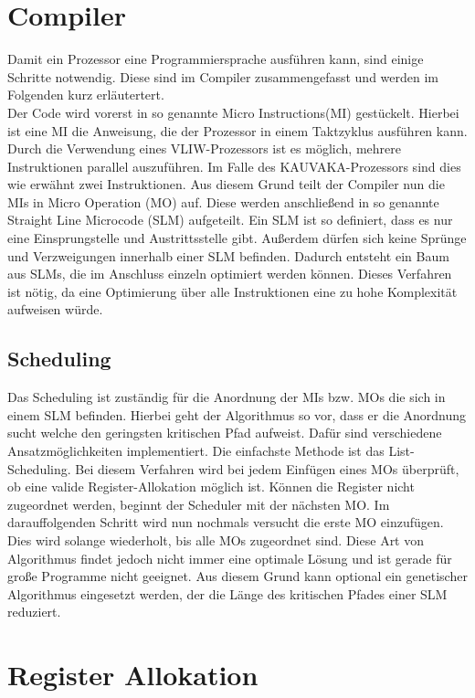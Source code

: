 \section{Compiler}
Damit ein Prozessor eine Programmiersprache ausführen kann, sind einige Schritte notwendig. Diese sind im Compiler zusammengefasst und werden im Folgenden kurz erläutertert.\\
Der Code wird vorerst in so genannte \glqq Micro Instructions\grqq(MI) gestückelt. Hierbei ist eine MI die Anweisung, die der Prozessor in einem Taktzyklus ausführen kann. Durch die Verwendung eines VLIW-Prozessors ist es möglich, mehrere Instruktionen parallel auszuführen. Im Falle des KAUVAKA-Prozessors sind dies wie erwähnt zwei Instruktionen. Aus diesem Grund teilt der Compiler nun die MIs in \glqq Micro Operation \grqq (MO) auf. Diese werden anschließend in so genannte \glqq Straight Line Microcode\grqq{} (SLM) aufgeteilt. Ein SLM ist so definiert, dass es nur eine Einsprungstelle und Austrittsstelle gibt. Außerdem dürfen sich keine Sprünge und Verzweigungen innerhalb einer SLM befinden.  Dadurch entsteht ein Baum aus SLMs, die im Anschluss einzeln optimiert werden können. Dieses Verfahren ist nötig, da eine Optimierung über alle Instruktionen eine zu hohe Komplexität aufweisen würde. \cite{landskov1980local}
\subsection{Scheduling}
\label{sec:scheduling}
Das Scheduling ist zuständig für die Anordnung der MIs bzw. MOs die sich in einem SLM befinden. Hierbei geht der Algorithmus so vor, dass er die Anordnung sucht welche den geringsten kritischen Pfad aufweist. Dafür sind verschiedene Ansatzmöglichkeiten implementiert. Die einfachste Methode ist das List-Scheduling. Bei diesem Verfahren wird bei jedem Einfügen eines MOs überprüft, ob eine valide Register-Allokation möglich ist. Können die Register nicht zugeordnet werden, beginnt der Scheduler mit der nächsten MO. Im darauffolgenden Schritt wird nun nochmals versucht die erste MO einzufügen. Dies wird solange wiederholt, bis alle MOs zugeordnet sind.\cite{landskov1980local}
Diese Art von Algorithmus findet jedoch nicht immer eine optimale Lösung und ist gerade für große Programme nicht geeignet. Aus diesem Grund kann optional ein genetischer Algorithmus eingesetzt werden, der die Länge des kritischen Pfades einer SLM reduziert.


\section{Register Allokation}
\label{sec:register allok}
